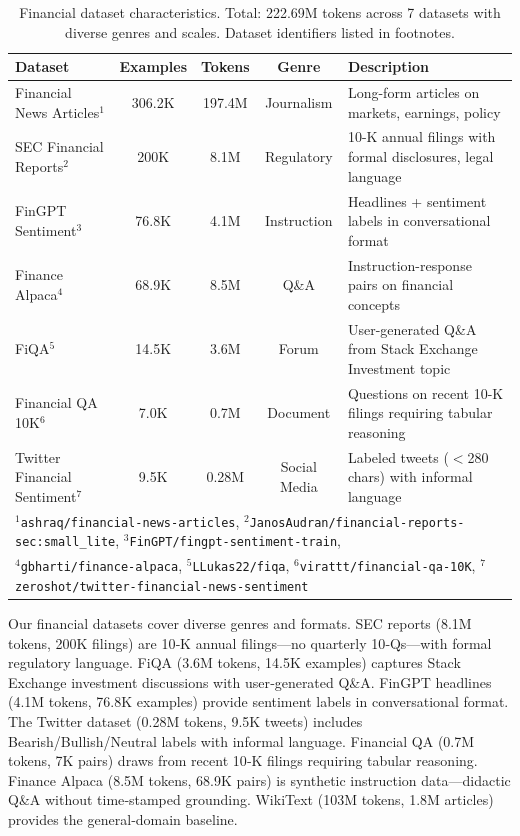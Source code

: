 \begin{table}[h]
\centering
\caption[Financial Dataset Characteristics]{Financial dataset characteristics. Total: 222.69M tokens across 7 datasets with diverse genres and scales. Dataset identifiers listed in footnotes.}
\label{tab:financial_datasets}
\small
\begin{tabular}{p{3.4cm}cccp{5.5cm}}
\toprule
\textbf{Dataset} & \textbf{Examples} & \textbf{Tokens} & \textbf{Genre} & \textbf{Description} \\
\midrule
Financial News Articles$^1$ & 306.2K & 197.4M & Journalism & Long-form articles on markets, earnings, policy \\
\midrule
SEC Financial Reports$^2$ & 200K & 8.1M & Regulatory & 10-K annual filings with formal disclosures, legal language \\
\midrule
FinGPT Sentiment$^3$ & 76.8K & 4.1M & Instruction & Headlines + sentiment labels in conversational format \\
\midrule
Finance Alpaca$^4$ & 68.9K & 8.5M & Q\&A & Instruction-response pairs on financial concepts \\
\midrule
FiQA$^5$ & 14.5K & 3.6M & Forum & User-generated Q\&A from Stack Exchange Investment topic \\
\midrule
Financial QA 10K$^6$ & 7.0K & 0.7M & Document & Questions on recent 10-K filings requiring tabular reasoning \\
\midrule
Twitter Financial Sentiment$^7$ & 9.5K & 0.28M & Social Media & Labeled tweets ($<$280 chars) with informal language \\
\bottomrule
\multicolumn{5}{l}{\footnotesize $^1$\texttt{ashraq/financial-news-articles}, $^2$\texttt{JanosAudran/financial-reports-sec:small\_lite}, $^3$\texttt{FinGPT/fingpt-sentiment-train},} \\
\multicolumn{5}{l}{\footnotesize $^4$\texttt{gbharti/finance-alpaca}, $^5$\texttt{LLukas22/fiqa}, $^6$\texttt{virattt/financial-qa-10K}, $^7$\texttt{zeroshot/twitter-financial-news-sentiment}}
\end{tabular}
\end{table}

Our financial datasets cover diverse genres and formats. SEC reports (8.1M tokens, 200K filings) are 10‑K annual filings—no quarterly 10‑Qs—with formal regulatory language. FiQA (3.6M tokens, 14.5K examples) captures Stack Exchange investment discussions with user‑generated Q\&A. FinGPT headlines (4.1M tokens, 76.8K examples) provide sentiment labels in conversational format. The Twitter dataset (0.28M tokens, 9.5K tweets) includes Bearish/Bullish/Neutral labels with informal language. Financial QA (0.7M tokens, 7K pairs) draws from recent 10‑K filings requiring tabular reasoning. Finance Alpaca (8.5M tokens, 68.9K pairs) is synthetic instruction data—didactic Q\&A without time‑stamped grounding. WikiText (103M tokens, 1.8M articles) provides the general‑domain baseline.

